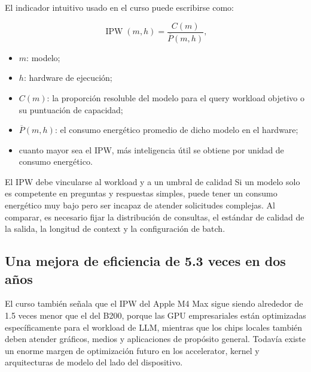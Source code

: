 \documentclass[a4paper]{article}
\begin{document}
El indicador intuitivo usado en el curso puede escribirse como:

$$
\operatorname{IPW}(m,h)=
\frac{C(m)}{\overline P(m,h)},
$$

\begin{itemize}
    \item $m$: modelo;
    \item $h$: hardware de ejecución;
    \item $C(m)$: la proporción resoluble del modelo para el query workload objetivo o su puntuación de capacidad;
    \item $\overline P(m,h)$: el consumo energético promedio de dicho modelo en el hardware;
    \item cuanto mayor sea el IPW, más inteligencia útil se obtiene por unidad de consumo energético.
\end{itemize}


\begin{warningbox}{El IPW debe vincularse al workload y a un umbral de calidad}
Si un modelo solo es competente en preguntas y respuestas simples, puede tener un consumo energético muy bajo pero ser incapaz de atender solicitudes complejas. Al comparar, es necesario fijar la distribución de consultas, el estándar de calidad de la salida, la longitud de context y la configuración de batch.
\end{warningbox}

\subsection{Una mejora de eficiencia de 5.3 veces en dos años}


El curso también señala que el IPW del Apple M4 Max sigue siendo alrededor de 1.5 veces menor que el del B200, porque las GPU empresariales están optimizadas específicamente para el workload de LLM, mientras que los chips locales también deben atender gráficos, medios y aplicaciones de propósito general. Todavía existe un enorme margen de optimización futuro en los accelerator, kernel y arquitecturas de modelo del lado del dispositivo.
\end{document}
